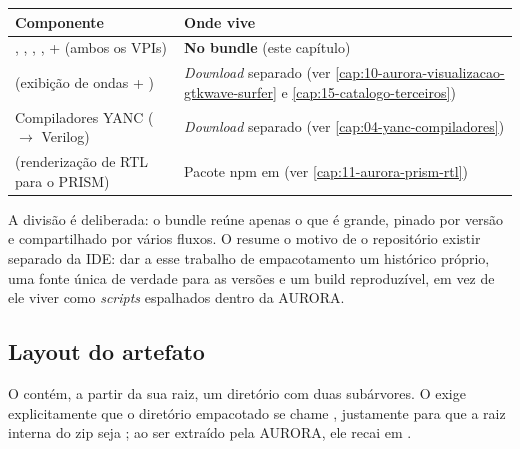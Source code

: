 \begin{tabularx}{\linewidth}{Y Y}
\toprule
\textbf{Componente} & \textbf{Onde vive} \\
\midrule
{}, , , , + (ambos os VPIs) & \textbf{No bundle} (este capítulo) \\
 (exibição de ondas + ) & \emph{Download} separado (ver \autoref{cap:10-aurora-visualizacao-gtkwave-surfer} e \autoref{cap:15-catalogo-terceiros}) \\
Compiladores YANC (\cmm{} $\rightarrow$ Verilog) & \emph{Download} separado (ver \autoref{cap:04-yanc-compiladores}) \\
 (renderização de RTL para o PRISM) & Pacote npm em  (ver \autoref{cap:11-aurora-prism-rtl}) \\
\bottomrule
\end{tabularx}

\medskip

A divisão é deliberada: o bundle reúne apenas o que é grande, pinado por versão
e compartilhado por vários fluxos. O  resume o motivo de o
repositório existir separado da IDE: dar a esse trabalho de empacotamento um
histórico próprio, uma fonte única de verdade para as versões e um build
reproduzível, em vez de ele viver como \emph{scripts} espalhados dentro da AURORA.

\subsection{Layout do artefato}

O  contém, a partir da sua raiz, um diretório 
com duas subárvores. O  exige explicitamente que o
diretório empacotado se chame , justamente para que a raiz interna do
zip seja ; ao ser extraído pela AURORA, ele recai em
.

